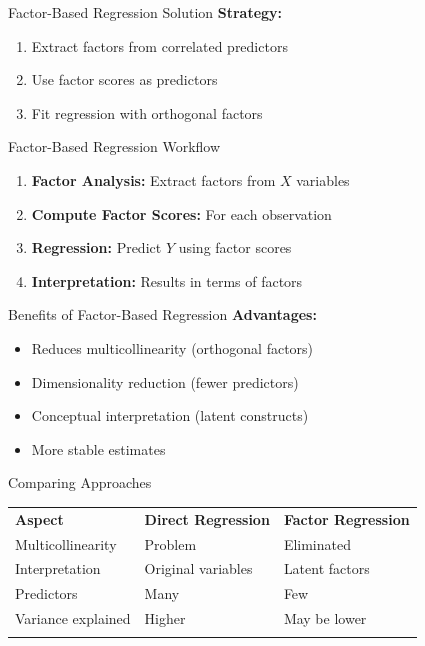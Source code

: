 \documentclass[aspectratio=169,ignorenonframetext]{beamer}
\begin{document}
\begin{frame}{Factor-Based Regression Solution}
\textbf{Strategy:}

\begin{enumerate}
\item
  Extract factors from correlated predictors
\item
  Use factor scores as predictors
\item
  Fit regression with orthogonal factors
\end{enumerate}
\end{frame}

\begin{frame}{Factor-Based Regression Workflow}
\begin{enumerate}
\item
  \textbf{Factor Analysis:} Extract factors from \(X\) variables
\item
  \textbf{Compute Factor Scores:} For each observation
\item
  \textbf{Regression:} Predict \(Y\) using factor scores
\item
  \textbf{Interpretation:} Results in terms of factors
\end{enumerate}
\end{frame}

\begin{frame}{Benefits of Factor-Based Regression}
\textbf{Advantages:}

\begin{itemize}
\item
  Reduces multicollinearity (orthogonal factors)
\item
  Dimensionality reduction (fewer predictors)
\item
  Conceptual interpretation (latent constructs)
\item
  More stable estimates
\end{itemize}
\end{frame}

\begin{frame}{Comparing Approaches}
{\def\LTcaptype{none} %
\begin{longtable}[]{@{}
  >{\raggedright\arraybackslash}p{}
  >{\centering\arraybackslash}p{}
  >{\centering\arraybackslash}p{}@{}}
\toprule\noalign{}
\endhead
\textbf{Aspect} & \textbf{Direct Regression} & \textbf{Factor
Regression} \\
Multicollinearity & Problem & Eliminated \\
Interpretation & Original variables & Latent factors \\
Predictors & Many & Few \\
Variance explained & Higher & May be lower \\
\bottomrule\noalign{}
\end{longtable}
}
\end{frame}
\end{document}
